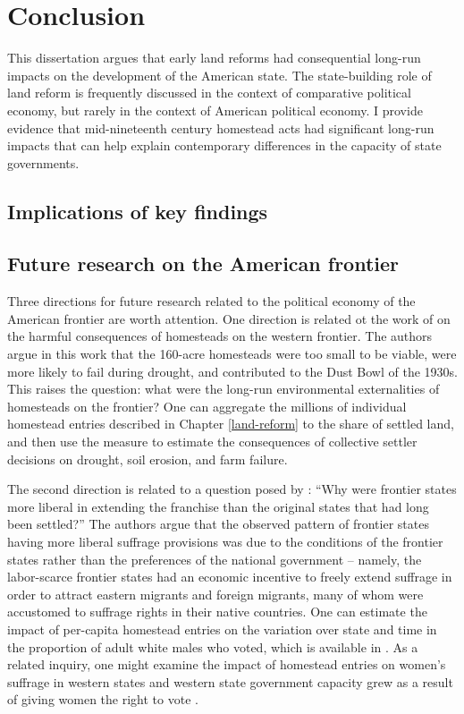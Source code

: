 \chapter{Conclusion}

This dissertation argues that early land reforms had consequential long-run impacts on the development of the American state. The state-building role of land reform is frequently discussed in the context of comparative political economy, but rarely in the context of American political economy. I provide evidence that mid-nineteenth century homestead acts had significant long-run impacts that can help explain contemporary differences in the capacity of state governments.

\section{Implications of key findings}

\section{Future research on the American frontier}

Three directions for future research related to the political economy of the American frontier are worth attention. One direction is related ot the work of \citet{hansen2001us} on the harmful consequences of homesteads on the western frontier. The authors argue in this work that the 160-acre homesteads were too small to be viable, were more likely to fail during drought, and contributed to the Dust Bowl of the 1930s. This raises the question: what were the long-run environmental externalities of homesteads on the frontier? One can aggregate the millions of individual homestead entries described in Chapter \ref{land-reform} to the share of settled land, and then use the measure to estimate the consequences of collective settler decisions on drought, soil erosion, and farm failure. 

The second direction is related to a question posed by \citet{engerman2005evolution}: ``Why were frontier states more liberal in extending the franchise than the original states that had long been settled?'' The authors argue that the observed pattern of frontier states having more liberal suffrage provisions was due to the conditions of the frontier states rather than the preferences of the national government -- namely, the labor-scarce frontier states had an economic incentive to freely extend suffrage in order to attract eastern migrants and foreign migrants, many of whom were accustomed to suffrage rights in their native countries. One can estimate the impact of per-capita homestead entries on the variation over state and time in the proportion of adult white males who voted, which is available in \citet{mccormick1960new}. As a related inquiry, one might examine the impact of homestead entries on women's suffrage in western states \citep{teele2018west} and western state government capacity grew as a result of giving women the right to vote \citep{lott1999did}.

